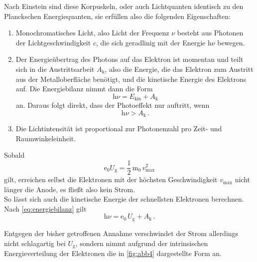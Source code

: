 Nach Einstein sind diese Korpuskeln, oder auch Lichtquanten identisch zu den Planckschen Energiequanten,
sie erfüllen also die folgenden Eigenschaften:

\begin{enumerate}
    \item Monochromatisches Licht, also Licht der Frequenz $\nu$ besteht aus Photonen der Lichtgeschwindigkeit $c$,
            die sich geradlinig mit der Energie $\text{h}\nu$ bewegen.
    \item Der Energieübertrag des Photons auf das Elektron ist momentan und teilt sich in die Austrittsarbeit $A_\text{k}$, 
            also die Energie, die das Elektron zum Austritt aus der Metalloberfläche benötigt, 
            und die kinetische Energie des Elektrons auf. Die Energiebilanz nimmt dann die 
            Form
            \begin{equation}
                \text{h} \nu = E_\text{kin} + A_\text{k}
                \label{eq:energiebilanz}
            \end{equation}
            an.
            Daraus folgt direkt, dass der Photoeffekt nur auftritt, wenn
            \begin{equation*}
                \text{h} \nu > A_\text{k} \,.
            \end{equation*}
    \item Die Lichtintensität ist proportional zur Photonenzahl pro Zeit- und Raumwinkeleinheit.
\end{enumerate}


Sobald
\begin{equation*}
    \text{e}_0 U_\text{g} = \dfrac{1}{2} \, \text{m}_0 \, v^2_\text{max}
\end{equation*}
gilt, erreichen selbst die Elektronen mit der höchsten Geschwindigkeit $v_\text{max}$ nicht länger die Anode, es fließt also kein Strom. \\

So lässt sich auch die kinetische Energie der schnellsten Elektronen berechnen.
Nach \eqref{eq:energiebilanz} gilt
\begin{equation*}
    \text{h} \nu = \text{e}_0 \,U_\text{g} + A_\text{k} \,.
\end{equation*}

Entgegen der bisher getroffenen Annahme verschwindet der Strom allerdings nicht schlagartig bei $U_\text{g}$, sondern nimmt aufgrund der intrinsischen Energieverteilung der Elektronen die in \autoref{fig:abb4}
dargestellte Form an.

